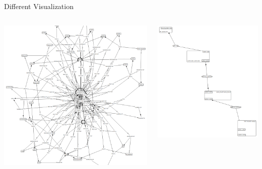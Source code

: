 \documentclass[pdf]
{beamer}
\begin{document}
\begin{frame}{Different Visualization}
    \begin{columns}
    	\begin{column}{.5\textwidth}
        \centering
        \includegraphics[width=\textwidth]{pics/HardwareGraph.png}
    	\end{column}
    	\begin{column}{.5\textwidth}
        \centering
        \includegraphics[width=\textwidth]{pics/HardwareGraphInterpreted.png}
    	\end{column}
    \end{columns}
\end{frame}
\end{document}
